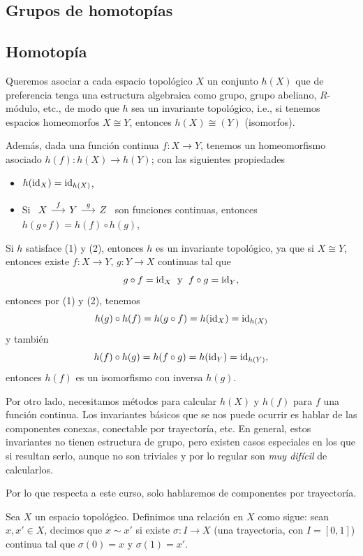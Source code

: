 \begin{center}
    \section{Grupos de homotopías}
\end{center}
\subsection{Homotopía}


Queremos asociar a cada espacio topológico $X$ un conjunto $h(X)$ que de preferencia tenga una estructura algebraica como grupo, grupo abeliano, $R$-módulo, etc., de modo que $h$ sea un invariante topológico, i.e., si tenemos espacios homeomorfos $X\cong Y$, entonces $h(X)\cong (Y)$ (isomorfos). 

Además, dada una función continua $f:X\to Y$, tenemos un homeomorfismo asociado $h(f):h(X)\to h(Y)$; con las siguientes propiedades
\begin{itemize}
    \item[(1)] $h(\mathrm{id}_X)=\mathrm{id}_{h(X)}$, \setlength{\parskip}{-0.3em}
    \item[(2)] Si $\begin{tikzcd}[column sep=0.5cm,row sep=1.25cm]  
                    X \ar[r,"f"] & Y \ar[r,"g"] & Z
                \end{tikzcd}$
            son funciones continuas, entonces $h(g\circ f)=h(f)\circ h(g)$,
\end{itemize}
\begin{nota}
    Si $h$ satisface (1) y (2), entonces $h$ es un invariante topológico, ya que si $X\cong Y$, entonces existe $f:X\to Y$, $g:Y\to X$ continuas tal que
    \[
    g\circ f=\mathrm{id}_X\;\text{ y }\; f\circ g=\mathrm{id}_Y,
    \]
    entonces por (1) y (2), tenemos
    \begin{equation*}
        h(g)\circ h(f)=h(g\circ f)=h(\mathrm{id}_X)=\mathrm{id}_{h(X)}
    \end{equation*}
    y también 
    \begin{equation*}
        h(f)\circ h(g)=h(f\circ g)=h(\mathrm{id}_Y)=\mathrm{id}_{h(Y)},
    \end{equation*}
    entonces $h(f)$ es un isomorfismo con inversa $h(g)$.

    Por otro lado, necesitamos métodos para calcular $h(X)$ y $h(f)$ para $f$ una función continua. Los invariantes básicos que se nos puede ocurrir es hablar de las componentes conexas, conectable por trayectoría, etc. En general, estos invariantes no tienen estructura de grupo, pero existen casos especiales en los que si resultan serlo, aunque no son triviales y por lo regular son \textit{muy difícil} de calcularlos.

    Por lo que respecta a este curso, solo hablaremos de componentes por trayectoría.
\end{nota}
\begin{definicion}
\label{rel:homo}
    Sea $X$ un espacio topológico. Definimos una relación en $X$ como sigue: sean $x,x'\in X$, decimos que $x\sim x'$ si existe $\sigma:I\to X$ (una trayectoria, con $I=[0,1]$) continua tal que $\sigma(0)=x$ y $\sigma(1)=x'$.
\end{definicion}

